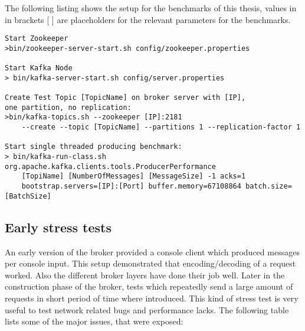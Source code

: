 The following listing shows the setup for the benchmarks of this thesis, values
in in brackets [ ] are placeholders for the relevant parameters for the
benchmarks.

\begin{verbatim}
Start Zookeeper
>bin/zookeeper-server-start.sh config/zookeeper.properties

Start Kafka Node 
> bin/kafka-server-start.sh config/server.properties

Create Test Topic [TopicName] on broker server with [IP], 
one partition, no replication: 
>bin/kafka-topics.sh --zookeeper [IP]:2181 
    --create --topic [TopicName] --partitions 1 --replication-factor 1

Start single threaded producing benchmark: 
> bin/kafka-run-class.sh org.apache.kafka.clients.tools.ProducerPerformance 
    [TopiName] [NumberOfMessages] [MessageSize] -1 acks=1 
    bootstrap.servers=[IP]:[Port] buffer.memory=67108864 batch.size=[BatchSize]
\end{verbatim}





\newpage
\subsection{Early stress tests}

An early version of the broker provided a console client which produced messages
per console input. This setup demonstrated that encoding/decoding of a request
worked. Also the different broker layers have done their job well.  Later in the
construction phase of the broker, tests which repeatedly send a large amount of
requests in short period of time where introduced. This kind of stress test is
very useful to test network related bugs and performance lacks. The following
table lists some of the major issues, that were exposed: 

